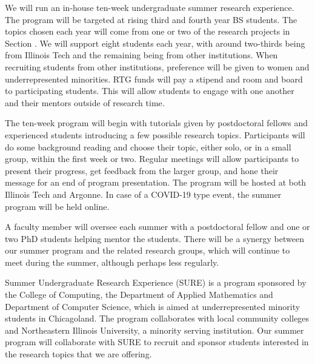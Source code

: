 \documentclass[11pt]{NSFamsart}
\begin{document}
We will run an in-house ten-week undergraduate summer research experience.  The program will be targeted at rising third and fourth year BS students.  The topics chosen each year will come from one or two of the research projects in Section \label{sec:researchproblems}.  We will support eight students each year, with around two-thirds being from Illinois Tech and the remaining being from other institutions.  When recruiting students from other institutions, preference will be given to women and underrepresented minorities.  RTG funds
will pay a stipend and room and board to participating students.  This will allow students to engage with one another and their mentors outside of research time.  

The ten-week program will begin with tutorials given by postdoctoral fellows and experienced students introducing a few possible research topics.  Participants will do some background reading and choose their topic, either solo, or in a small group, within the first week or two.  Regular meetings will allow participants to present their progress, get feedback from the larger group, and hone their message for an end of program presentation. The program will be hosted at both Illinois Tech and Argonne.  In case of a COVID-19 type event, the summer program will be held online.

A faculty member will oversee each summer with a postdoctoral fellow and one or two PhD students helping mentor the students.  There will be a synergy between our summer program and the related research groups, which will continue to meet during the summer, although perhaps less regularly.

Summer Undergraduate Research Experience (SURE) is a program sponsored by the College of Computing, the Department of Applied
Mathematics and Department of Computer Science, which is aimed at underrepresented minority students in Chicagoland.  The program collaborates with local community colleges and Northeastern Illinois University, a minority serving institution.  Our summer program will collaborate with SURE to recruit and sponsor students interested in the research topics that we are offering.
 
\end{document}
